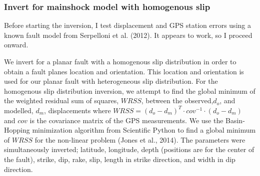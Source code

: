 \documentclass[11pt]{article}
\begin{document}
    \subsubsection{Invert for mainshock model with homogenous
slip}\label{invert-for-mainshock-model-with-homogenous-slip}

    Before starting the inversion, I test displacement and GPS station
errors using a known fault model from Serpelloni et al. (2012). It
appears to work, so I proceed onward.

We invert for a planar fault with a homogenous slip distribution in
order to obtain a fault planes location and orientation. This location
and orientation is used for our planar fault with heterogeneous slip
distribution. For the homogenous slip distribution inversion, we attempt
to find the global minimum of the weighted residual sum of squares,
\(WRSS\), between the observed,\(d_o\), and modelled, \(d_m\),
displacements where
\(WRSS = \left( d_{o}−d_{m} \right)^{T}\cdot cov^{−1} \cdot \left( d_{o}−d_{m} \right)\)
and \(cov\) is the covariance matrix of the GPS measurements. We use the
Basin-Hopping minimization algorithm from Scientific Python to find a
global minimum of \(WRSS\) for the non-linear problem (Jones et al.,
2014). The parameters were simultaneously inverted; latitude, longitude,
depth (positions are for the center of the fault), strike, dip, rake,
slip, length in strike direction, and width in dip direction.
\end{document}
